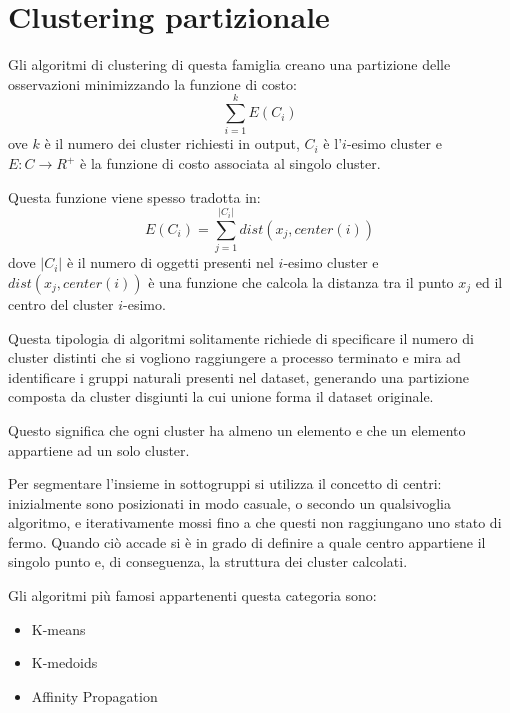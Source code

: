 \section{Clustering partizionale}
	Gli algoritmi di clustering di questa famiglia creano una partizione delle osservazioni minimizzando la funzione di costo:
	\begin{equation*}
	  \sum_{i=1}^{k}{E(C_i)}
	\end{equation*}
	ove $k$ è il numero dei cluster richiesti in output, $C_i$ è l'$i$-esimo cluster e $E:C \rightarrow R^{+}$ è la funzione di costo associata al singolo cluster.

	Questa funzione viene spesso tradotta in\cite{funzione_costo}:
	\begin{equation*}
	  	E(C_i) = \sum_{j=1}^{|C_i|}{dist(x_j, center(i))}
	\end{equation*}
dove $|C_i|$ è il numero di oggetti presenti nel $i$-esimo cluster e $dist(x_j, center(i))$ è una funzione che calcola la distanza tra il punto $x_j$ ed il centro del cluster $i$-esimo.

	Questa tipologia di algoritmi solitamente richiede di specificare il numero di cluster distinti che si vogliono raggiungere a processo terminato e mira ad identificare i gruppi naturali presenti nel dataset, generando una partizione composta da cluster disgiunti la cui unione forma il dataset originale.

	Questo significa che ogni cluster ha almeno un elemento e che un elemento appartiene ad un solo cluster.

	Per segmentare l'insieme in sottogruppi si utilizza il concetto di centri: inizialmente sono posizionati in modo casuale, o secondo un qualsivoglia algoritmo, e iterativamente mossi fino a che questi non raggiungano uno stato di fermo. Quando ciò accade si è in grado di definire a quale centro appartiene il singolo punto e, di conseguenza, la struttura dei cluster calcolati. 

	Gli algoritmi più famosi appartenenti questa categoria sono: 
	\begin{itemize}
	  	\item K-means
	  	\item K-medoids
	  	\item Affinity Propagation
	\end{itemize}
